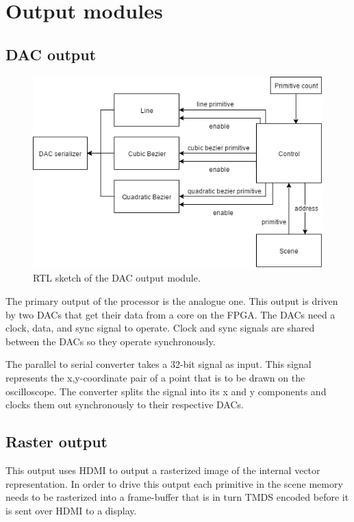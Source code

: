 \chapter{Output modules}
\label{chap:Output}

\section{DAC output}

\begin{figure}[h!]
    \includegraphics[width=\linewidth]{images/dac-output.png}
    \caption{RTL sketch of the \vthreek DAC output module.}
    \label{fig:dac-output}
\end{figure}

The primary output of the processor is the analogue one.
This output is driven by two DACs that get their data from a core on the FPGA.
The DACs need a clock, data, and sync signal to operate. 
Clock and sync signals are shared between the DACs so they operate synchronously. 

The parallel to serial converter takes a 32-bit signal as input.
This signal represents the x,y-coordinate pair of a point that is to be drawn on the oscilloscope.
The converter splits the signal into its x and y components and clocks them out synchronously to their respective DACs.

\section{Raster output}

This output uses HDMI to output a rasterized image of the internal vector representation.
In order to drive this output each primitive in the scene memory needs to be rasterized into a frame-buffer that is in turn TMDS encoded before it is sent over HDMI to a display.